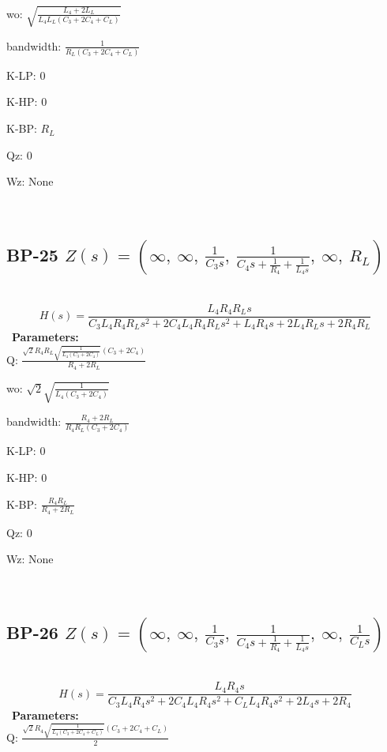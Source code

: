 \documentclass{article}
\begin{document}
wo: $\sqrt{\frac{L_{4} + 2 L_{L}}{L_{4} L_{L} \left(C_{3} + 2 C_{4} + C_{L}\right)}}$\ 

bandwidth: $\frac{1}{R_{L} \left(C_{3} + 2 C_{4} + C_{L}\right)}$\ 

K-LP: $0$\ 

K-HP: $0$\ 

K-BP: $R_{L}$\ 

Qz: $0$\ 

Wz: $\text{None}$\ 

\ 

\subsection{BP-25 $Z(s) = \left( \infty, \  \infty, \  \frac{1}{C_{3} s}, \  \frac{1}{C_{4} s + \frac{1}{R_{4}} + \frac{1}{L_{4} s}}, \  \infty, \  R_{L}\right)$ } \ 
\textbf{\[H(s) = \frac{L_{4} R_{4} R_{L} s}{C_{3} L_{4} R_{4} R_{L} s^{2} + 2 C_{4} L_{4} R_{4} R_{L} s^{2} + L_{4} R_{4} s + 2 L_{4} R_{L} s + 2 R_{4} R_{L}}\] } \ 
\textbf{Parameters:}\\ 

Q: $\frac{\sqrt{2} R_{4} R_{L} \sqrt{\frac{1}{L_{4} \left(C_{3} + 2 C_{4}\right)}} \left(C_{3} + 2 C_{4}\right)}{R_{4} + 2 R_{L}}$\ 

wo: $\sqrt{2} \sqrt{\frac{1}{L_{4} \left(C_{3} + 2 C_{4}\right)}}$\ 

bandwidth: $\frac{R_{4} + 2 R_{L}}{R_{4} R_{L} \left(C_{3} + 2 C_{4}\right)}$\ 

K-LP: $0$\ 

K-HP: $0$\ 

K-BP: $\frac{R_{4} R_{L}}{R_{4} + 2 R_{L}}$\ 

Qz: $0$\ 

Wz: $\text{None}$\ 

\ 

\subsection{BP-26 $Z(s) = \left( \infty, \  \infty, \  \frac{1}{C_{3} s}, \  \frac{1}{C_{4} s + \frac{1}{R_{4}} + \frac{1}{L_{4} s}}, \  \infty, \  \frac{1}{C_{L} s}\right)$ } \ 
\textbf{\[H(s) = \frac{L_{4} R_{4} s}{C_{3} L_{4} R_{4} s^{2} + 2 C_{4} L_{4} R_{4} s^{2} + C_{L} L_{4} R_{4} s^{2} + 2 L_{4} s + 2 R_{4}}\] } \ 
\textbf{Parameters:}\\ 

Q: $\frac{\sqrt{2} R_{4} \sqrt{\frac{1}{L_{4} \left(C_{3} + 2 C_{4} + C_{L}\right)}} \left(C_{3} + 2 C_{4} + C_{L}\right)}{2}$\ 
\end{document}
